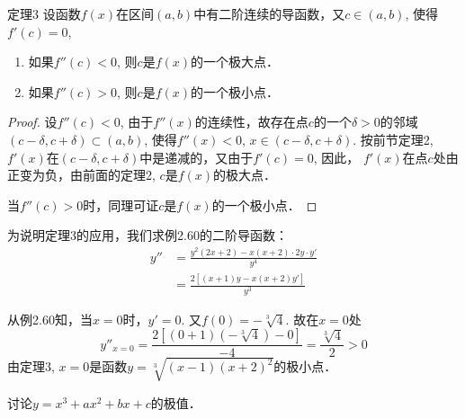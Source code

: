 \begin{solution}
\begin{figure}[htp]
    \caption{}
\end{figure}
\end{solution}

\begin{blk}
{定理3} 设函数$f(x)$在区间$(a,b)$中有二阶连续的导函数，又$c\in (a,b)$, 使得$f' (c) =0$,
\begin{enumerate}
    \item 如果$f''(c)<0$, 则$c$是$f(x)$的一个极大点．
    \item 如果$f''(c)>0$, 则$c$是$f(x)$的一个极小点．
\end{enumerate}
\end{blk}

\begin{proof}
设$f''(c)<0$, 由于$f''(x)$的连续性，故存在点$c$的一个$\delta>0$的邻域$(c-\delta,c+\delta)\subset (a,b)$, 使得$f''(x)<0$, $x\in (c-\delta,c+\delta)$. 按前节定理2, $f'(x)$在$(c-\delta,c+\delta)$中是递减的，又由于$f'(c)=0$, 因此，
$f'(x)$在点$c$处由正变为负，由前面的定理2, $c$是$f(x)$的极大点．

当$f''(c)>0$时，同理可证$c$是$f(x)$的一个极小点．
\end{proof}

为说明定理3的应用，我们求例2.60的二阶导函数：
\begin{align*}
   y''&=\frac{y^2 (2x+2) -x (x+2) \cdot 2y\cdot y'}{y^4}\\
&=\frac{2 [ (x+1) y-x (x+2) y']}{y^3} 
\end{align*}

从例2.60知，当$x=0$时，$y'=0$. 又$f(0)=-\sqrt[3]{4}$. 故在$x=0$处
\[y''_{x=0}=\frac{2\left[(0+1)\left(-\sqrt[3]{4}\right)-0\right]}{-4}=\frac{\sqrt[3]{4}}{2}>0\]
由定理3, $x=0$是函数$y=\sqrt[3]{(x-1)(x+2)^2}$的极小点．




\begin{example}
    讨论$y=x^3+ax^2+bx+c$的极值．
\end{example}


